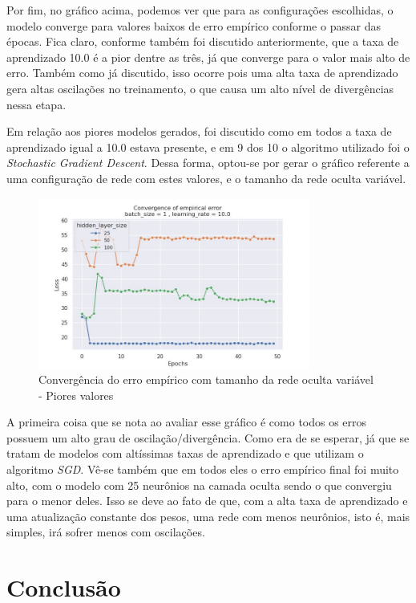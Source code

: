 \documentclass{article}
\begin{document}
Por fim, no gráfico acima, podemos ver que para as configurações escolhidas, o modelo converge para valores baixos de erro empírico conforme o passar das épocas.
Fica claro, conforme também foi discutido anteriormente, que a taxa de aprendizado 10.0 é a pior dentre as três, já que converge para o valor mais alto de erro. Também
como já discutido, isso ocorre pois uma alta taxa de aprendizado gera altas oscilações no treinamento, o que causa um alto nível de divergências nessa etapa.

Em relação aos piores modelos gerados, foi discutido como em todos a taxa de aprendizado igual a 10.0 estava presente, e em 9 dos 10 o algoritmo utilizado foi o \textit{Stochastic Gradient Descent}.
Dessa forma, optou-se por gerar o gráfico referente a uma configuração de rede com estes valores, e o tamanho da rede oculta variável.

\begin{figure}[H]
    \centering
    \includegraphics[width=0.8\textwidth]{images/empirical_error/hidden_layer_size_not_fixed_bad.jpg}
    \caption{Convergência do erro empírico com tamanho da rede oculta variável - Piores valores}
\end{figure}

A primeira coisa que se nota ao avaliar esse gráfico é como todos os erros possuem um alto grau de oscilação/divergência. Como era de se
esperar, já que se tratam de modelos com altíssimas taxas de aprendizado e que utilizam o algoritmo \textit{SGD}. Vê-se também
que em todos eles o erro empírico final foi muito alto, com o modelo com 25 neurônios na camada oculta sendo o que convergiu
para o menor deles. Isso se deve ao fato de que, com a alta taxa de aprendizado e uma atualização constante dos pesos, uma rede
com menos neurônios, isto é, mais simples, irá sofrer menos com oscilações.

\section{Conclusão}
\end{document}
